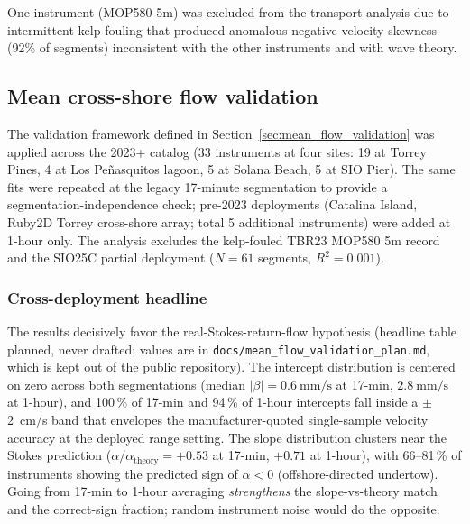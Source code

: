 One instrument (MOP580 5m) was excluded from the transport analysis
due to intermittent kelp fouling that produced anomalous negative
velocity skewness (92\% of segments) inconsistent with the other
instruments and with wave theory.

\subsection{Mean cross-shore flow validation}
\label{sec:mean_flow_results}


The validation framework defined in
Section~\ref{sec:mean_flow_validation} was applied across the
2023+ catalog (33 instruments at four sites: 19 at Torrey Pines,
4 at Los Pe\~nasquitos lagoon, 5 at Solana Beach, 5 at SIO Pier).
The same fits were repeated at the legacy 17-minute segmentation
to provide a segmentation-independence check; pre-2023 deployments
(Catalina Island, Ruby2D Torrey cross-shore array; total 5
additional instruments) were added at 1-hour only. The analysis
excludes the kelp-fouled TBR23 MOP580 5m record and the
SIO25C partial deployment ($N = 61$ segments, $R^2 = 0.001$).

\subsubsection{Cross-deployment headline}
The results decisively favor the real-Stokes-return-flow hypothesis
(headline table planned, never drafted; values are in
\texttt{docs/mean\_flow\_validation\_plan.md}, which is kept out of the public
repository). The intercept distribution
is centered on zero across both segmentations (median $|\beta| =
\SI{0.6}{\milli\meter\per\second}$ at 17-min,
$\SI{2.8}{\milli\meter\per\second}$ at 1-hour), and 100\,\% of
17-min and 94\,\% of 1-hour intercepts fall inside a $\pm$2~cm/s
band that envelopes the manufacturer-quoted single-sample velocity
accuracy at the deployed range setting. The slope distribution
clusters near the Stokes prediction
($\alpha/\alpha_\text{theory} = +0.53$ at 17-min, $+0.71$ at
1-hour), with 66--81\,\% of instruments showing the predicted sign
of $\alpha < 0$ (offshore-directed undertow). Going from 17-min to
1-hour averaging \emph{strengthens} the slope-vs-theory match and
the correct-sign fraction; random instrument noise would do the
opposite.

